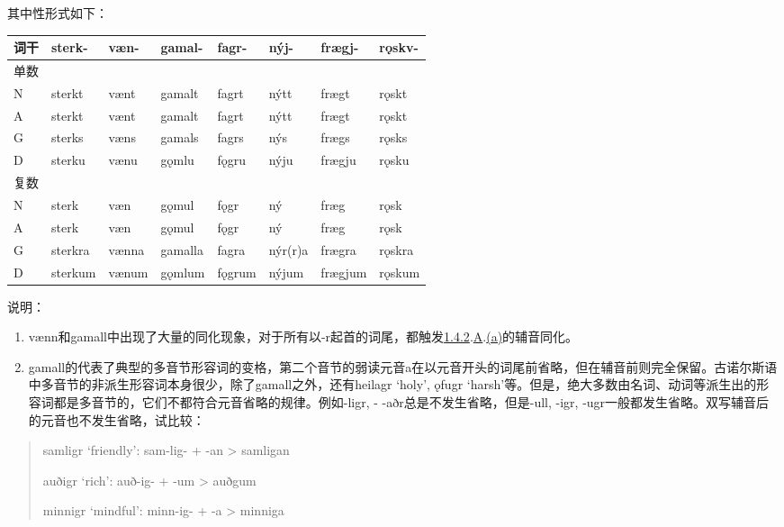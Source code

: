 其中性形式如下：

\begin{longtable}{llllllll}
\toprule
词干 & sterk- & væn- & gamal- & fagr- & nýj- & frægj- & rǫskv- \\
\midrule
\endhead
\bottomrule
\endfoot
单数 & & & & & & & \\
N & sterkt & vænt & gamalt & fagrt & nýtt & frægt & rǫskt \\
A & sterkt & vænt & gamalt & fagrt & nýtt & frægt & rǫskt \\
G & sterks & væns & gamals & fagrs & nýs & frægs & rǫsks \\
D & sterku & vænu & gǫmlu & fǫgru & nýju & frægju & rǫsku \\
复数 & & & & & & & \\
N & sterk & væn & gǫmul & fǫgr & ný & fræg & rǫsk \\
A & sterk & væn & gǫmul & fǫgr & ný & fræg & rǫsk \\
G & sterkra & vænna & gamalla & fagra & nýr(r)a & frægra & rǫskra \\
D & sterkum & vænum & gǫmlum & fǫgrum & nýjum & frægjum & rǫskum \\
\end{longtable}

说明：

\begin{enumerate}
\def\labelenumi{\arabic{enumi})}
\item
  vænn和gamall中出现了大量的同化现象，对于所有以-r起首的词尾，都触发\hyperref[ux8f85ux97f3ux7684ux97f3ux53d8]{1.4.2}.\hyperref[_Ref117517666]{A}.\hyperref[_Ref117517668]{(a)}的辅音同化。
\item
  gamall的代表了典型的多音节形容词的变格，第二个音节的弱读元音a在以元音开头的词尾前省略，但在辅音前则完全保留。古诺尔斯语中多音节的非派生形容词本身很少，除了gamall之外，还有heilagr
  `holy', ǫfugr
  `harsh'等。但是，绝大多数由名词、动词等派生出的形容词都是多音节的，它们不都符合元音省略的规律。例如-ligr,
  - -aðr总是不发生省略，但是-ull, -igr,
  -ugr一般都发生省略。双写辅音后的元音也不发生省略，试比较：
\end{enumerate}

\begin{quote}
samligr `friendly': sam-lig- + -an \textgreater{} samligan

auðigr `rich': auð-ig- + -um \textgreater{} auðgum

minnigr `mindful': minn-ig- + -a \textgreater{} minniga
\end{quote}

